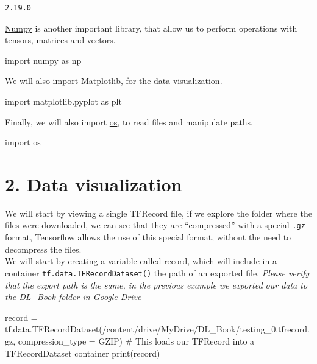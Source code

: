 \documentclass[
  letterpaper,
  DIV=11,
  numbers=noendperiod]{scrreprt}
\newenvironment{Shaded}{\begin{snugshade}}{\end{snugshade}}
\newcommand{\BuiltInTok}[1]{\textcolor[rgb]{0.00,0.23,0.31}{#1}}
\newcommand{\CommentTok}[1]{\textcolor[rgb]{0.37,0.37,0.37}{#1}}
\newcommand{\ImportTok}[1]{\textcolor[rgb]{0.00,0.46,0.62}{#1}}
\newcommand{\NormalTok}[1]{\textcolor[rgb]{0.00,0.23,0.31}{#1}}
\newcommand{\OperatorTok}[1]{\textcolor[rgb]{0.37,0.37,0.37}{#1}}
\newcommand{\StringTok}[1]{\textcolor[rgb]{0.13,0.47,0.30}{#1}}
\begin{document}
\begin{verbatim}
2.19.0
\end{verbatim}

\href{https://numpy.org/}{Numpy} is another important library, that
allow us to perform operations with tensors, matrices and vectors.

\begin{Shaded}
\begin{Highlighting}[]
\ImportTok{import}\NormalTok{ numpy }\ImportTok{as}\NormalTok{ np}
\end{Highlighting}
\end{Shaded}

We will also import \href{https://matplotlib.org/}{Matplotlib}, for the
data visualization.

\begin{Shaded}
\begin{Highlighting}[]
\ImportTok{import}\NormalTok{ matplotlib.pyplot }\ImportTok{as}\NormalTok{ plt}
\end{Highlighting}
\end{Shaded}

Finally, we will also import
\href{https://docs.python.org/3/library/os.html}{os}, to read files and
manipulate paths.

\begin{Shaded}
\begin{Highlighting}[]
\ImportTok{import}\NormalTok{ os}
\end{Highlighting}
\end{Shaded}

\section{2. Data visualization}\label{data-visualization}

We will start by viewing a single TFRecord file, if we explore the
folder where the files were downloaded, we can see that they are
``compressed'' with a special \texttt{.gz} format, Tensorflow allows the
use of this special format, without the need to decompress the files.\\
We will start by creating a variable called record, which will include
in a container \texttt{tf.data.TFRecordDataset()} the path of an
exported file. \emph{Please verify that the export path is the same, in
the previous example we exported our data to the DL\_Book folder in
Google Drive}

\begin{Shaded}
\begin{Highlighting}[]
\NormalTok{record }\OperatorTok{=}\NormalTok{ tf.data.TFRecordDataset(}\StringTok{\textquotesingle{}/content/drive/MyDrive/DL\_Book/testing\_0.tfrecord.gz\textquotesingle{}}\NormalTok{, compression\_type }\OperatorTok{=} \StringTok{\textquotesingle{}GZIP\textquotesingle{}}\NormalTok{) }\CommentTok{\# This loads our TFRecord into a TFRecordDataset container}
\BuiltInTok{print}\NormalTok{(record)}
\end{Highlighting}
\end{Shaded}
\end{document}
